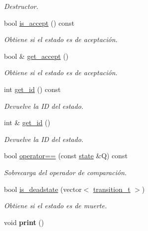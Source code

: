 \begin{DoxyCompactItemize}
\begin{DoxyCompactList}\small\item\em Destructor. \end{DoxyCompactList}\item 
bool \hyperlink{classstate_a49f9a14bacf7ccd3180555a646e6a02f}{is\+\_\+accept} () const 
\begin{DoxyCompactList}\small\item\em Obtiene si el estado es de aceptación. \end{DoxyCompactList}\item 
bool \& \hyperlink{classstate_a5c4e93170fd515a2d3e6e9d392b29d2f}{get\+\_\+accept} ()
\begin{DoxyCompactList}\small\item\em Obtiene si el estado es de aceptación. \end{DoxyCompactList}\item 
int \hyperlink{classstate_a6e5e89c3ed6c2e2594bc1a8bf03bdc1e}{get\+\_\+id} () const 
\begin{DoxyCompactList}\small\item\em Devuelve la I\+D del estado. \end{DoxyCompactList}\item 
int \& \hyperlink{classstate_a68ce8440ba42436828362ded2edd8d87}{get\+\_\+id} ()
\begin{DoxyCompactList}\small\item\em Devuelve la I\+D del estado. \end{DoxyCompactList}\item 
bool \hyperlink{classstate_ac9e58d75849a619942eedde3576ffefd}{operator==} (const \hyperlink{classstate}{state} \&Q) const 
\begin{DoxyCompactList}\small\item\em Sobrecarga del operador de comparación. \end{DoxyCompactList}\item 
bool \hyperlink{classstate_a18a1f9add291e9aa896b8baa9ed1dbe4}{is\+\_\+deadstate} (vector$<$ \hyperlink{classtransition__t}{transition\+\_\+t} $>$)
\begin{DoxyCompactList}\small\item\em Obtiene si el estado es de muerte. \end{DoxyCompactList}\item 
\hypertarget{classstate_a8cd42463fb7015ac1bda015d6d662eb1}{}void {\bfseries print} ()\label{classstate_a8cd42463fb7015ac1bda015d6d662eb1}

\end{DoxyCompactItemize}
